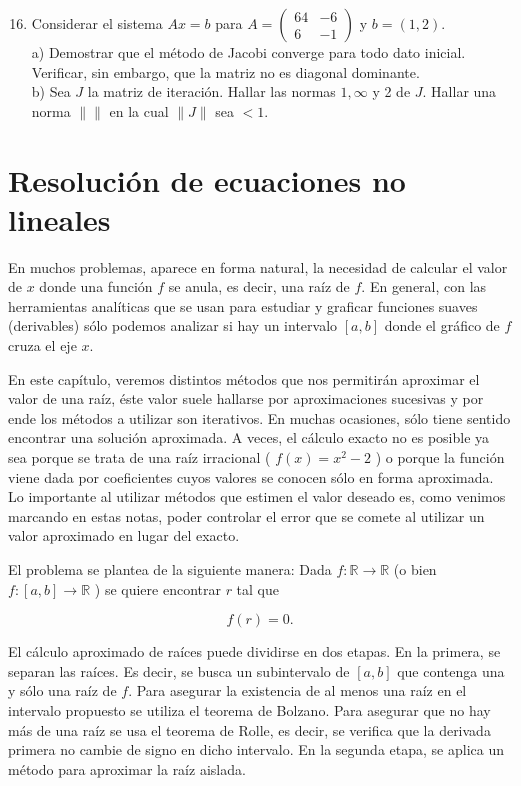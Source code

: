 \documentclass[10pt]{book}
\begin{document}
\begin{enumerate}
  \setcounter{enumi}{15}
  \item Considerar el sistema $A x=b$ para $A=\left(\begin{array}{cc}64 & -6 \\ 6 & -1\end{array}\right)$ y $b=(1,2)$.\\
a) Demostrar que el método de Jacobi converge para todo dato inicial. Verificar, sin embargo, que la matriz no es diagonal dominante.\\
b) Sea $J$ la matriz de iteración. Hallar las normas $1, \infty$ y 2 de $J$. Hallar una norma $\|\|$ en la cual $\|J\|$ sea $<1$.
\end{enumerate}

\chapter{Resolución de ecuaciones no lineales}
En muchos problemas, aparece en forma natural, la necesidad de calcular el valor de $x$ donde una función $f$ se anula, es decir, una raíz de $f$. En general, con las herramientas analíticas que se usan para estudiar y graficar funciones suaves (derivables) sólo podemos analizar si hay un intervalo $[a, b]$ donde el gráfico de $f$ cruza el eje $x$.

En este capítulo, veremos distintos métodos que nos permitirán aproximar el valor de una raíz, éste valor suele hallarse por aproximaciones sucesivas y por ende los métodos a utilizar son iterativos. En muchas ocasiones, sólo tiene sentido encontrar una solución aproximada. A veces, el cálculo exacto no es posible ya sea porque se trata de una raíz irracional ( $f(x)=x^{2}-2$ ) o porque la función viene dada por coeficientes cuyos valores se conocen sólo en forma aproximada. Lo importante al utilizar métodos que estimen el valor deseado es, como venimos marcando en estas notas, poder controlar el error que se comete al utilizar un valor aproximado en lugar del exacto.

El problema se plantea de la siguiente manera: Dada $f: \mathbb{R} \rightarrow \mathbb{R}$ (o bien $f:[a, b] \rightarrow \mathbb{R}$ ) se quiere encontrar $r$ tal que

$$
f(r)=0 .
$$

El cálculo aproximado de raíces puede dividirse en dos etapas. En la primera, se separan las raíces. Es decir, se busca un subintervalo de $[a, b]$ que contenga una y sólo una raíz de $f$. Para asegurar la existencia de al menos una raíz en el intervalo propuesto se utiliza el teorema de Bolzano. Para asegurar que no hay más de una raíz se usa el teorema de Rolle, es decir, se verifica que la derivada primera no cambie de signo en dicho intervalo. En la segunda etapa, se aplica un método para aproximar la raíz aislada.
\end{document}
